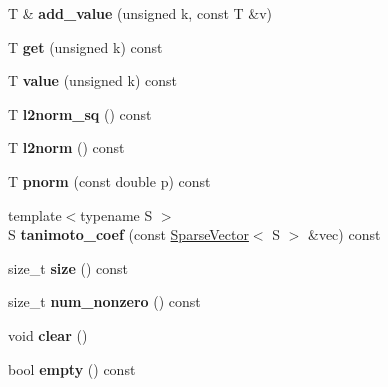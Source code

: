 \begin{DoxyCompactItemize}
T \& {\bfseries add\+\_\+value} (unsigned k, const T \&v)
\item 
\mbox{\label{classcpyp_1_1_sparse_vector_a6ff198d4f5e1bde25f3a9aaba13c094e}} 
T {\bfseries get} (unsigned k) const
\item 
\mbox{\label{classcpyp_1_1_sparse_vector_a60728a19fc2b207979c1bd0a1b63b611}} 
T {\bfseries value} (unsigned k) const
\item 
\mbox{\label{classcpyp_1_1_sparse_vector_a22be6f6912f469706cf2f798201a6a9e}} 
T {\bfseries l2norm\+\_\+sq} () const
\item 
\mbox{\label{classcpyp_1_1_sparse_vector_a06285bc0fcf3dd86664aef6415269d42}} 
T {\bfseries l2norm} () const
\item 
\mbox{\label{classcpyp_1_1_sparse_vector_a95d0a840d1eb71705c17ff22bd498257}} 
T {\bfseries pnorm} (const double p) const
\item 
\mbox{\label{classcpyp_1_1_sparse_vector_a8232c9fda49960e650478c9c9de8b416}} 
{\footnotesize template$<$typename S $>$ }\\S {\bfseries tanimoto\+\_\+coef} (const \mbox{\hyperlink{classcpyp_1_1_sparse_vector}{Sparse\+Vector}}$<$ S $>$ \&vec) const
\item 
\mbox{\label{classcpyp_1_1_sparse_vector_a45922a4c5be95d6e72c119c15bf8c404}} 
size\+\_\+t {\bfseries size} () const
\item 
\mbox{\label{classcpyp_1_1_sparse_vector_a5f8f3b62adebeece48b0dec6a9cb1bf8}} 
size\+\_\+t {\bfseries num\+\_\+nonzero} () const
\item 
\mbox{\label{classcpyp_1_1_sparse_vector_ae11acd5c8f6fcea5cb98262d674a5711}} 
void {\bfseries clear} ()
\item 
\mbox{\label{classcpyp_1_1_sparse_vector_ab6b5047179057f594120784fe54eebdd}} 
bool {\bfseries empty} () const

\end{DoxyCompactItemize}
